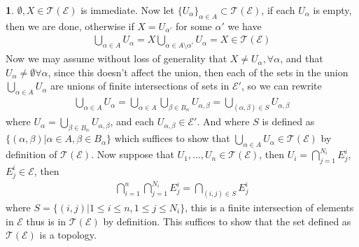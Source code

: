 \documentclass[10.5pt]{article}
\theoremstyle{definition}
\newtheorem{pb}{}
\newcommand{\set}[1]{\{#1\}}
\begin{document}
    \begin{pb}
        \(\emptyset, X \in \mathcal{T}(\mathcal{E})\) is immediate. Now let \(\set{U_\alpha}_{\alpha\in A} \subset \mathcal{T}(\mathcal{E})\), if each \(U_\alpha\) is empty, then we are done, otherwise if \(X = U_{\alpha'}\) for some \(\alpha'\) we have 
        \begin{align*}
            \bigcup_{\alpha \in A}U_\alpha = X \bigcup_{\alpha \in A \setminus \alpha'} U_\alpha = X \in \mathcal{T}(\mathcal{E})
        \end{align*}
        Now we may assume without loss of generality that \(X \neq U_\alpha, \forall \alpha\), and that \(U_\alpha \neq \emptyset \forall \alpha\), since this doesn't affect the union, then
        each of the sets in the union \(\bigcup_{\alpha\in A}U_\alpha\) are unions of finite intersections of sets in \(\mathcal{E}'\), so we can rewrite
        \begin{align*}
            \bigcup_{\alpha \in A}U_\alpha = \bigcup_{\alpha \in A} \bigcup_{\beta \in B_\alpha} U_{\alpha,\beta} = \bigcup_{(\alpha,\beta) \in S} U_{\alpha,\beta}
        \end{align*}
        where \(U_\alpha = \bigcup_{\beta \in B_\alpha} U_{\alpha,\beta}\), and each \(U_{\alpha,\beta} \in \mathcal{E}'\). And where \(S\) is defined as \(\set{(\alpha,\beta) \vert \alpha \in A, \beta \in B_\alpha}\) which suffices to show that \(\bigcup_{\alpha \in A} U_\alpha \in \mathcal{T}(\mathcal{E})\) by definition of \(\mathcal{T}(\mathcal{E})\). Now suppose that \(U_1,\hdots,U_n \in \mathcal{T}(\mathcal{E})\), then \(U_i = \bigcap_{j=1}^{N_i} E^i_j\), \(E_j^i \in \mathcal{E}\), then
        \begin{align*}
            \bigcap_{i=1}^n \bigcap_{j=1}^{N_i} E_j^i = \bigcap_{(i,j) \in S} E_j^i
        \end{align*}
        where \(S = \set{(i,j) \vert 1\leq i \leq n, 1 \leq j \leq N_i}\), this is a finite intersection of elements in \(\mathcal{E}\) thus is in \(\mathcal{T}(\mathcal{E})\) by definition. This suffices to show that the set defined as \(\mathcal{T}(\mathcal{E})\) is a topology.


\end{pb}
\end{document}
